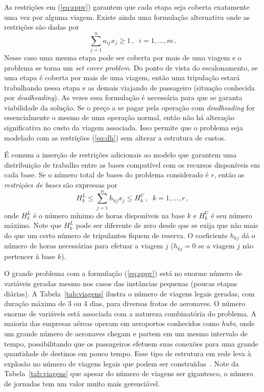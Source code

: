 \documentclass[12pt,a4paper]{article}
\newcommand{\ev}{\, ,}                                       %
\newcommand{\ep}{\, .}                                       %
\begin{document}
As restrições em (\ref{eq:sppv}) garantem que cada etapa seja coberta exatamente uma vez por alguma
viagem. Existe ainda uma formulação alternativa onde as restrições são dadas por
%
\begin{equation} \label{eq:dh} 
	\sum_{j=1}^n a_{ij} x_j \geq 1 \, , \;\; i = 1, \ldots, m \ep
\end{equation} 
%
Nesse caso uma mesma etapa pode ser coberta por mais de uma viagem e o problema se torna um
\emph{set cover problem}. Do ponto de vista do escalonamento, se uma etapa é coberta por mais
de uma viagem, então uma tripulação estará trabalhando nessa etapa e as demais viajando de
passageiro (situação conhecida por \emph{deadheading}). As vezes essa formulação é necessária para
que se garanta viabilidade da solução. Se o preço a se pagar pela operação com \emph{deadheading} 
for essencialmente o mesmo de uma operação normal, então não há alteração significativa no custo 
da viagem associada. Isso permite que o problema seja modelado com as restrições (\ref{eq:dh}) 
sem alterar a estrutura de custos.

É comum a inserção de restrições adicionais ao modelo que garantem uma distribuição de trabalho
entre as bases compatível com os recursos disponíveis em cada base. Se o número total de bases do
problema considerado é $r$, então as \emph{restrições de bases} são expressas por
%
\begin{equation} \label{eq:bases}
	H_k^L \leq \sum_{j=1}^n h_{kj} x_j \leq H_k^U \, , \;\; k = 1, \ldots, r \ev
\end{equation}
%
onde $H_k^L$ é o número mínimo de horas disponíveis na base $k$ e $H_k^U$ é seu número máximo. 
Note que $H_k^L$ pode ser diferente de zero desde que se exija que não mais do que um certo número 
de tripulantes fiquem de reserva. O coeficiente $h_{kj}$ dá o número de horas necessárias para 
efetuar a viagem $j$ ($h_{kj} = 0$ se a viagem $j$ não pertencer à base $k$).

O grande problema com a formulação (\ref{eq:sppv}) está no enorme número de variáveis geradas mesmo
nos casos das instâncias pequenas (poucas etapas diárias). A Tabela~\ref{tab:viagens} ilustra o
número de viagens legais geradas, com duração máxima de 3 ou 4 dias, para diversas frotas de
aeronaves. O número enorme de variáveis está associada com a natureza combinatória do problema. A
maioria das empresas aéreas operam em aeroportos conhecidos como \emph{hubs}, onde um grande número
de aeronaves chegam e partem em um mesmo intervalo de tempo, possibilitando que os passageiros
efetuem suas conexões para uma grande quantidade de destinos em pouco tempo. Esse tipo de estrutura
em rede leva à explosão no número de viagens legais que podem ser construídas~\cite{graves93}.
Note da Tabela~\ref{tab:viagens} que apesar do número de viagens ser gigantesco, o número de 
jornadas tem um valor muito mais gerenciável.
\end{document}
